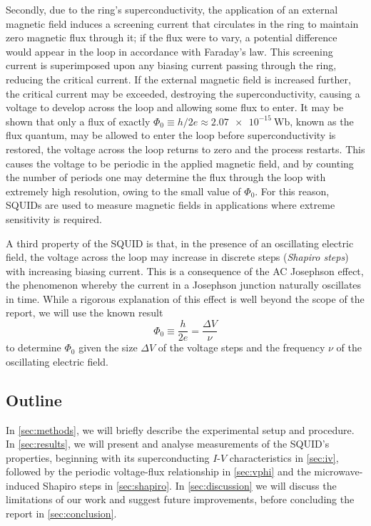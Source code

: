 \documentclass[twocol]{ametsocV6.1}
\begin{document}
Secondly, due to the ring's superconductivity, the application of
an external magnetic field induces a screening current that circulates
in the ring to maintain zero magnetic flux through it; if the flux were to
vary, a potential difference would appear in the loop in accordance with
Faraday's law. This screening current is superimposed upon any biasing
current passing through the ring, reducing the critical current.
If the external magnetic field is increased further, the critical current may
be exceeded, destroying the superconductivity, causing a voltage
to develop across the loop and allowing some flux to enter.
It may be shown that only a flux of exactly
$\Phi_0 \equiv h/2e \approx \SI{2.07e-15}{\weber}$, known as the flux
quantum, may be allowed to enter the loop before
superconductivity is restored, the voltage across the loop returns to zero
and the process restarts. This causes the voltage to be periodic in the
applied magnetic field, and by counting the number of periods one may
determine the flux through the loop with extremely high resolution, owing to
the small value of $\Phi_0$. For this reason, SQUIDs are used to measure
magnetic fields in applications where extreme sensitivity is required.

A third property of the SQUID is that, in the presence of an oscillating
electric field, the voltage across the loop may increase in discrete steps
(\emph{Shapiro steps})
with increasing biasing current. This is a consequence of the AC Josephson
effect, the phenomenon whereby the current in a Josephson junction naturally
oscillates in time. While a rigorous explanation of this effect is well beyond
the scope of the report, we will use the known result
\begin{equation}
	\Phi_0 \equiv \frac{h}{2e} = \frac{\Delta V}{\nu} \label{eqn:h-e_ratio}
\end{equation}
to determine $\Phi_0$ given the size $\Delta V$ of the voltage steps
and the frequency $\nu$ of the oscillating electric field.

\subsection{Outline}
In \autoref{sec:methods}, we will briefly describe the experimental setup
and procedure. In \autoref{sec:results}, we will present and analyse
measurements of the SQUID's properties, beginning with its superconducting
$I$-$V$ characteristics in \autoref{sec:iv}, followed by the periodic
voltage-flux relationship in \autoref{sec:vphi} and the microwave-induced
Shapiro steps in \autoref{sec:shapiro}. In \autoref{sec:discussion} we will
discuss the limitations of our work and suggest future improvements,
before concluding the report in \autoref{sec:conclusion}.
\end{document}
